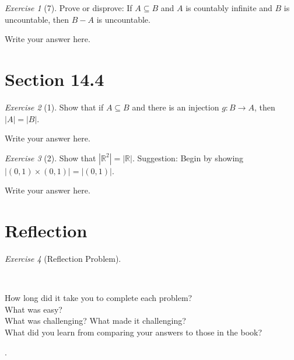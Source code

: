 \documentclass[12pt]{amsart}
\makeatletter
\theoremstyle{remark}
\newtheorem*{exercise}{Exercise}%
\def\RR{\ensuremath{\mathbb R}}
\renewenvironment{proof}[1][\proofname]{\par\doublespacing
  \pushQED{\qed}%
  \normalfont \topsep6\p@\@plus6\p@\relax
  \list{}{%
    \settowidth{\leftmargin}{\itshape\proofname:\hskip\labelsep}%
    \setlength{\labelwidth}{0pt}%
    \setlength{\itemindent}{-\leftmargin}%
  }%
  \item[\hskip\labelsep\itshape#1\@addpunct{:}]\ignorespaces
}{%
  \popQED\endlist\@endpefalse
  \singlespacing
}
\theoremstyle{mycomment}
\makeatother
\begin{document}
\begin{exercise}[7] Prove or disprove: If $A\subseteq B$ and $A$ is countably infinite and $B$ is uncountable, then $B-A$ is uncountable.
\begin{proof}
Write your answer here.
\end{proof}
\end{exercise}



\section*{Section 14.4}
\begin{exercise}[1] Show that if $A\subseteq B$ and there is an injection $g:B\to A$, then $|A|=|B|$.
\begin{proof}
Write your answer here.
\end{proof}
\end{exercise}

\begin{exercise}[2] Show that $|\RR^{2}|=|\RR|$. Suggestion: Begin by showing $|(0,1)\times(0,1)|=|(0,1)|$.
 \begin{proof}
Write your answer here.
\end{proof}
\end{exercise}


\section*{Reflection}
\begin{exercise}[Reflection Problem] \ 

\begin{proof}[Answers] \ \\
\begin{description}
\item[How long did it take you to complete each problem?]
\item[What was easy?]
\item[What was challenging? What made it challenging?]
\item[What did you learn from comparing your answers to those in the book?]
\end{description}
\end{proof}
\end{exercise}.









 
\end{document}
